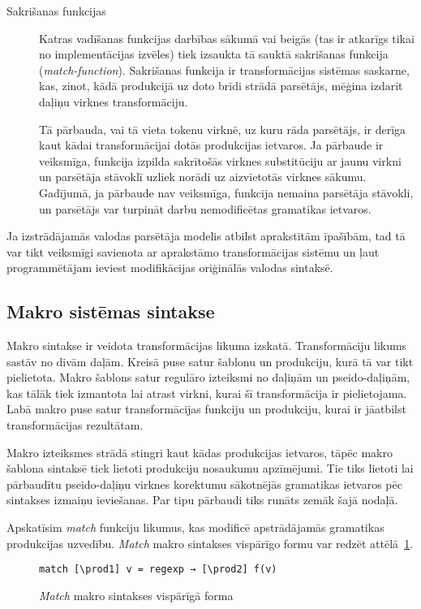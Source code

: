 \begin{description}
\item[Sakrišanas funkcijas]
Katras vadīšanas funkcijas darbības sākumā vai beigās (tas ir atkarīgs tikai no implementācijas izvēles) tiek izsaukta tā sauktā sakrišanas funkcija (\emph{match-function}). Sakrišanas funkcija ir transformācijas sistēmas saskarne, kas, zinot, kādā produkcijā uz doto brīdi strādā parsētājs, mēģina izdarīt daļiņu virknes transformāciju.

Tā pārbauda, vai tā vieta tokenu virknē, uz kuru rāda parsētājs, ir derīga kaut kādai transformācijai dotās produkcijas ietvaros. Ja pārbaude ir veiksmīga, funkcija izpilda sakrītošās virknes substitūciju ar jaunu virkni un parsētāja stāvoklī uzliek norādi uz aizvietotās virknes sākumu. Gadījumā,  ja pārbaude nav veiksmīga, funkcija nemaina parsētāja stāvokli, un parsētājs var turpināt darbu nemodificētas gramatikas ietvaros.
\end{description}

Ja izstrādājamās valodas parsētāja modelis atbilst aprakstītām īpašībām, tad tā var tikt veiksmīgi savienota ar aprakstāmo transformācijas sistēmu un ļaut programmētājam ieviest modifikācijas oriģinālās valodas sintaksē.

\subsection{\label{sbs:sys_macrosyntax}Makro sistēmas sintakse}

Makro sintakse ir veidota transformācijas likuma izskatā. Transformāciju likums sastāv no divām daļām. Kreisā puse satur šablonu un produkciju, kurā tā var tikt pielietota. Makro šablons satur regulāro izteiksmi no daļiņām un pseido-daļiņām, kas tālāk tiek izmantota lai atrast virkni, kurai šī transformācija ir pielietojama. Labā makro puse satur transformācijas funkciju un produkciju, kurai ir jāatbilst transformācijas rezultātam.

Makro izteiksmes strādā stingri kaut kādas produkcijas ietvaros, tāpēc makro šablona sintaksē tiek lietoti produkciju nosaukumu apzīmējumi. Tie tiks lietoti lai pārbaudītu pseido-daļiņu virknes korektumu sākotnējās gramatikas ietvaros pēc sintakses izmaiņu ieviešanas. Par tipu pārbaudi tiks runāts zemāk šajā nodaļā.

Apskatīsim \textit{match} funkciju likumus, kas modificē apstrādājamās gramatikas produkcijas uzvedību. \emph{Match} makro sintakses vispārīgo formu var redzēt attēlā~\ref{fig:matchsyntax}.

\begin{figure}[h!]
\begin{verbatim}
match [\prod1] v = regexp → [\prod2] f(v)
\end{verbatim}
\caption{\label{fig:matchsyntax}\emph{Match} makro sintakses vispārīgā forma}
\end{figure}

